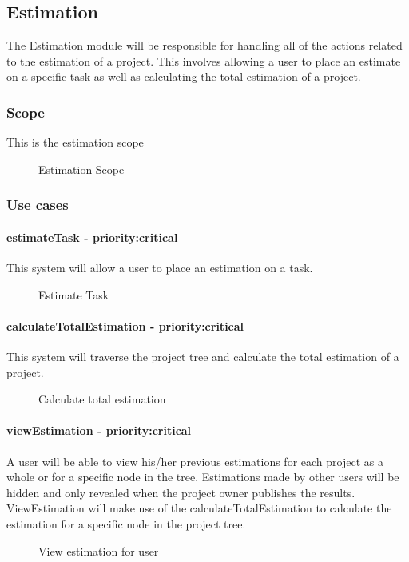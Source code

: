\subsection{Estimation}
	The Estimation module will be responsible for handling all of the actions related to the estimation of a project. This involves allowing a user to place an estimate on a specific task as well as calculating the total estimation of a project.
\subsubsection{Scope}
	This is the estimation scope
	\begin{figure}[H]
	    	\centering
	    	\caption{Estimation Scope}
	    	\label{fig:Estimation_Scope}
   	\end{figure}
\subsubsection{Use cases}
	\paragraph{estimateTask - priority:critical}This system will allow a user to place an estimation on a task.
	\begin{figure}[H]
	    	\centering
	    	\caption{Estimate Task}
	    	\label{fig:Estimation_estimateTask.png}
   	\end{figure}
	\paragraph{calculateTotalEstimation - priority:critical}This system will traverse the project tree and calculate the total estimation of a project.
	\begin{figure}[H]
	    	\centering
	    	\caption{Calculate total estimation}
	    	\label{fig:Estimation_calculateTotalEstimation.png}
   	\end{figure}
	\paragraph{viewEstimation - priority:critical}A user will be able to view his/her previous estimations for each project as a whole or for a specific node in the tree. Estimations made by other users will be hidden and only revealed when the project owner publishes the results. ViewEstimation will make use of the calculateTotalEstimation to calculate the estimation for a specific node in the project tree.
	\begin{figure}[H]
	    	\centering
	    	\caption{View estimation for user}
	    	\label{fig:Estimation_viewEstimation.png}
   	\end{figure}
